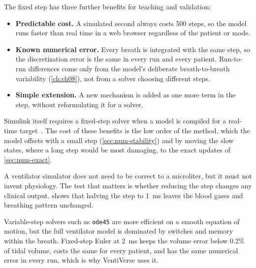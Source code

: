 The fixed step has three further benefits for teaching and validation:
\begin{itemize}[leftmargin=*]
  \item \textbf{Predictable cost.} A simulated second always costs 500 steps, so the model runs faster than real time in a web browser regardless of the patient or mode.
  \item \textbf{Known numerical error.} Every breath is integrated with the same step, so the discretization error is the same in every run and every patient. Run-to-run differences come only from the model's deliberate breath-to-breath variability (\cref{ch:ch08}), not from a solver choosing different steps.
  \item \textbf{Simple extension.} A new mechanism is added as one more term in the step, without reformulating it for a solver.
\end{itemize}
Simulink itself requires a fixed-step solver when a model is compiled for a real-time target~\citep{mathworks_solvers}. The cost of these benefits is the low order of the method, which the model offsets with a small step (\cref{sec:num-stability}) and by moving the slow states, where a long step would be most damaging, to the exact updates of \cref{sec:num-exact}.

\begin{clinicalpearl}
A ventilator simulator does not need to be correct to a microliter, but it must not invent physiology. The test that matters is whether reducing the step changes any clinical output.  shows that halving the step to \SI{1}{\milli\second} leaves the blood gases and breathing pattern unchanged.
\end{clinicalpearl}

\begin{summarybox}
Variable-step solvers such as \texttt{ode45} are more efficient on a smooth equation of motion, but the full ventilator model is dominated by switches and memory within the breath. Fixed-step Euler at \SI{2}{\milli\second} keeps the volume error below 0.2\% of tidal volume, costs the same for every patient, and has the same numerical error in every run, which is why VentiVerse uses it.
\end{summarybox}
